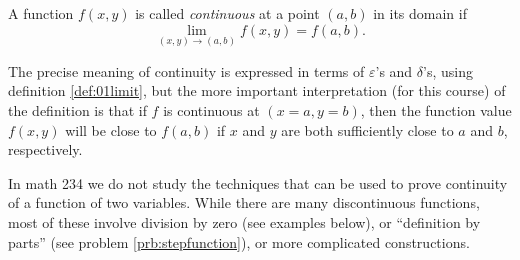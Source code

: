 \begin{definition}
  \label{sec:def-of-continuity}
  A function $f(x, y)$ is called \emph{continuous} at a point
  $(a,b)$ in its domain if
  \[
  \lim_{(x,y) \to (a,b)} f(x, y) = f(a,b).
  \]
\end{definition}

The precise meaning of continuity is expressed in terms of
$\varepsilon$'s and $\delta$'s, using definition \ref{def:01limit},
but the more important interpretation (for this course) of the
definition is that if $f$ is continuous at $(x=a, y=b)$, then the
function value $f(x, y)$ will be close to $f(a, b)$ if $x$ and
$y$ are both sufficiently close to $a$ and $b$, respectively.

In math 234 we do not study the techniques that can be used to prove
continuity of a function of two variables.  While there are many
discontinuous functions, most of these involve division by zero (see
examples below), or ``definition by parts'' (see problem
\ref{prb:stepfunction}), or more complicated constructions.

\begin{figure}[th]\centering
\end{figure}

